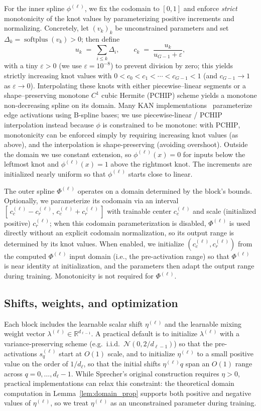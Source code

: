\documentclass{article}
\theoremstyle{plain}
\theoremstyle{definition}
\theoremstyle{remark}
\begin{document}
For the inner spline $\phi^{(\ell)}$, we fix the codomain to $[0,1]$ and enforce \emph{strict} monotonicity of the knot values by parameterizing positive increments and normalizing. Concretely, let $(v_k)_k$ be unconstrained parameters and set $\Delta_k=\operatorname{softplus}(v_k)>0$; then define
$$u_k \;=\; \sum_{i\le k}\Delta_i,\qquad c_k \;=\; \frac{u_k}{u_{G-1}+\varepsilon},$$
with a tiny $\varepsilon>0$ (we use $\varepsilon=10^{-8}$) to prevent division by zero; this yields strictly increasing knot values with $0<c_0<c_1<\cdots<c_{G-1}<1$ (and $c_{G-1}\to 1$ as $\varepsilon\to 0$). Interpolating these knots with either piecewise--linear segments or a shape--preserving monotone $C^1$ cubic Hermite (\textsc{PCHIP}) scheme yields a monotone non-decreasing spline on its domain. Many KAN implementations~\cite{liu2024kan} parameterize edge activations using B-spline bases; we use piecewise-linear / \textsc{PCHIP} interpolation instead because $\phi$ is constrained to be monotone: with \textsc{PCHIP}, monotonicity can be enforced simply by requiring increasing knot values (as above), and the interpolation is shape-preserving (avoiding overshoot). Outside the domain we use constant extension, so $\phi^{(\ell)}(x)=0$ for inputs below the leftmost knot and $\phi^{(\ell)}(x)=1$ above the rightmost knot. The increments are initialized nearly uniform so that $\phi^{(\ell)}$ starts close to linear.

The outer spline $\Phi^{(\ell)}$ operates on a domain determined by the block’s bounds. Optionally, we parameterize its codomain via an interval $[\,c_c^{(\ell)}-c_r^{(\ell)},\,c_c^{(\ell)}+c_r^{(\ell)}\,]$ with trainable center $c_c^{(\ell)}$ and scale (initialized positive) $c_r^{(\ell)}$; when this codomain parameterization is disabled, $\Phi^{(\ell)}$ is used directly without an explicit codomain normalization, so its output range is determined by its knot values. When enabled, we initialize $(c_c^{(\ell)},c_r^{(\ell)})$ from the computed $\Phi^{(\ell)}$ input domain (i.e., the pre-activation range) so that $\Phi^{(\ell)}$ is near identity at initialization, and the parameters then adapt the output range during training. Monotonicity is not required for $\Phi^{(\ell)}$.

\subsection{Shifts, weights, and optimization}
Each block includes the learnable scalar shift $\eta^{(\ell)}$ and the learnable mixing weight vector $\lambda^{(\ell)} \in \mathbb{R}^{d_{\ell-1}}$. A practical default is to initialize $\lambda^{(\ell)}$ with a variance-preserving scheme (e.g.\ i.i.d.\ $\mathcal{N}(0,2/d_{\ell-1})$) so that the pre-activations $s_q^{(\ell)}$ start at $O(1)$ scale, and to initialize $\eta^{(\ell)}$ to a small positive value on the order of $1/d_\ell$, so that the initial shifts $\eta^{(\ell)}q$ span an $O(1)$ range across $q=0,\dots,d_\ell-1$. While Sprecher's original construction requires $\eta>0$, practical implementations can relax this constraint: the theoretical domain computation in Lemma~\ref{lem:domain_prop} supports both positive and negative values of $\eta^{(\ell)}$, so we treat $\eta^{(\ell)}$ as an unconstrained parameter during training.
\end{document}
